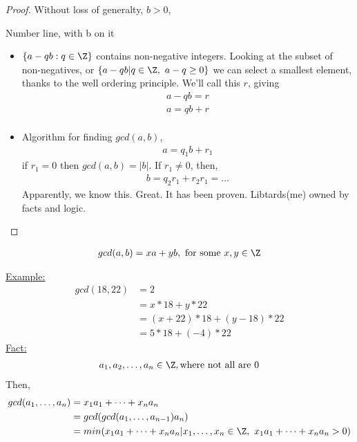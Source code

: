 \documentclass[../notes.tex]{subfiles}
\begin{document}
\begin{proof}
    Without loss of generalty, $b>0$,\\
    \begin{center}
        \Large{Number line, with b on it}\\
    \end{center}
    \begin{itemize}
        \item $\{a-qb: q\in \Z\}$ contains non-negative integers. Looking
            at the subset of non-negatives, or $\{a-qb | q\in \Z,\ a-q\geq0\}$
            we can select a smallest element, thanks to the well ordering
            principle. We'll call this $r$, giving
            \begin{align*}
                a-qb=r\\
                a=qb+r\\
            \end{align*}
        \item Algorithm for finding $gcd(a,b)$,
            \begin{align*}
                a=q_1b+r_1
            \end{align*}
            if $r_1=0$ then $gcd(a,b)=|b|$. If $r_1\neq 0$, then,
            \begin{align*}
                b = q_2r_1+r_2
                r_1=\dots
            \end{align*}
            Apparently, we know this. Great. It has been proven. Libtards(me)
            owned by facts and logic.
    \end{itemize}
\end{proof}
\begin{theorem} %
    \begin{align*}
        gcd(a,b)=xa+yb,\ \text{for some}\ x,y\in\Z\\
    \end{align*}
\end{theorem}
\underline{Example:}
\begin{align*}
    gcd(18,22)&=2\\
    &=x*18+y*22\\
    &=(x+22)*18+(y-18)*22\\
    &=5*18+(-4)*22
\end{align*}
\underline{Fact:}
\begin{align*}
    a_1,a_2,\dots,a_n\in\Z, \text{where not all are 0}\\
\end{align*}
Then,
\begin{align*}
    gcd(a_1,\dots,a_n)&=x_1a_1+\dots+x_na_n\\
    &=gcd(gcd(a_1,\dots,a_{n-1})a_n)\\
    &=min(x_1a_1+\dots+x_na_n|x_1,\dots,x_n\in \Z,\ x_1a_1+\dots+x_na_n>0)
\end{align*}
\end{document}
